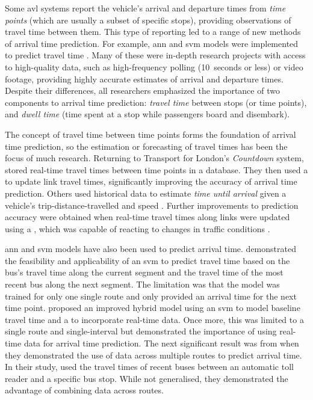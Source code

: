 Some \gls{avl} systems report the vehicle's arrival and departure times from \emph{time points} (which are usually a subset of specific stops), providing observations of travel time between them. This type of reporting led to a range of new methods of arrival time prediction. For example, \gls{ann} and \gls{svm} models were implemented to predict travel time \citep{Jeong_2005,Shalaby_2004,Yu_2011,Cats_2015,Cats_2016,Yin_2017}. Many of these were in-depth research projects with access to high-quality data, such as high-frequency polling (10~seconds or less) or video footage, providing highly accurate estimates of arrival and departure times. Despite their differences, all researchers emphasized the importance of two components to arrival time prediction: \emph{travel time} between stops (or time points), and \emph{dwell time} (time spent at a stop while passengers board and disembark).


The concept of travel time between time points forms the foundation of arrival time prediction, so the estimation or forecasting of travel times has been the focus of much research. Returning to Transport for London's \emph{Countdown} system, \citet{Reinhoudt_1997} stored real-time travel times between time points in a database. They then used a \kf{} to update link travel times, significantly improving the accuracy of arrival time prediction. Others used historical data to estimate \emph{time until arrival} given a vehicle's trip-distance-travelled and speed \citep{Wall_1999,Dailey_2001,Cathey_2003}. Further improvements to prediction accuracy were obtained when real-time travel times along links were updated using a \kf{}, which was capable of reacting to changes in traffic conditions \citep{Shalaby_2004}.


\Gls{ann} and \gls{svm} models have also been used to predict arrival time.  demonstrated the feasibility and applicability of an \gls{svm} to predict travel time based on the bus's travel time along the current segment and the travel time of the most recent bus along the next segment. The limitation was that the model was trained for only one single route and only provided an arrival time for the next time point. \citet{Yu_2010} proposed an improved hybrid model using an \gls{svm} to model baseline travel time and a \kf{} to incorporate real-time data. Once more, this was limited to a single route and single-interval but demonstrated the importance of using real-time data for arrival time prediction. The next significant result was from \citet{Yu_2011} when they demonstrated the use of data across multiple routes to predict arrival time. In their study, \citeauthor{Yu_2011} used the travel times of recent buses between an automatic toll reader and a specific bus stop. While not generalised, they demonstrated the advantage of combining data across routes.


